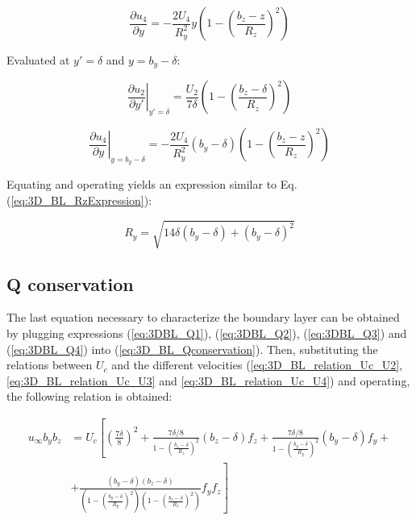 \begin{equation}
\frac{\partial u_4}{\partial y} = - \frac{2 U_4}{R_y^2} y  \left( 1 - \left( \frac{b_z - z}{R_z} \right)^2 \right) 
\end{equation}

Evaluated at $y' = \delta$ and $y = b_y - \delta$:

\begin{equation}
\left. \frac{\partial u_2}{\partial y'} \right|_{y' = \delta} = \frac{U_2}{7 \delta}  \left( 1 - \left( \frac{b_z - \delta}{R_z} \right)^2 \right) 
\end{equation}

\begin{equation}
\left. \frac{\partial u_4}{\partial y} \right|_{y = b_y - \delta} = - \frac{2 U_4}{R_y^2} \left( b_y - \delta \right) \left( 1 - \left( \frac{b_z - z}{R_z} \right)^2 \right) 
\end{equation}

Equating and operating yields an expression similar to Eq. (\ref{eq:3D_BL_RzExpression}):

\begin{equation}
\label{eq:3D_BL_RyExpression}
\boxed{
R_y = \sqrt{14 \delta \left( b_y - \delta \right) + \left( b_y - \delta \right)^2 }
}
\end{equation}

\subsection{Q conservation}

The last equation necessary to characterize the boundary layer can be obtained by plugging expressions (\ref{eq:3DBL_Q1}), (\ref{eq:3DBL_Q2}), (\ref{eq:3DBL_Q3}) and (\ref{eq:3DBL_Q4}) into (\ref{eq:3D_BL_Qconservation}). Then, substituting the relations between $U_c$ and the different velocities (\ref{eq:3D_BL_relation_Uc_U2}, \ref{eq:3D_BL_relation_Uc_U3} and  \ref{eq:3D_BL_relation_Uc_U4}) and operating, the following relation is obtained:

\begin{equation}
\begin{split}
u_\infty b_y b_z &= U_c \left[ \left( \frac{7 \delta}{8} \right)^2 + \frac{7 \delta/8}{1 - \left( \frac{b_z - \delta}{R_z}  \right)^2} \left( b_z - \delta \right) f_z  +  \frac{7 \delta/8}{1 - \left( \frac{b_y - \delta}{R_y}  \right)^2} \left( b_y - \delta \right) f_y  + \right. \\ 
 & + \left. \frac{ \left( b_y - \delta \right) \left( b_z - \delta \right) }{ \left( 1 - \left( \frac{b_y - \delta}{R_y}  \right)^2 \right) \left( 1 - \left( \frac{b_z - \delta}{R_z}  \right)^2 \right) } f_y f_z \right]
\end{split}
\end{equation}

